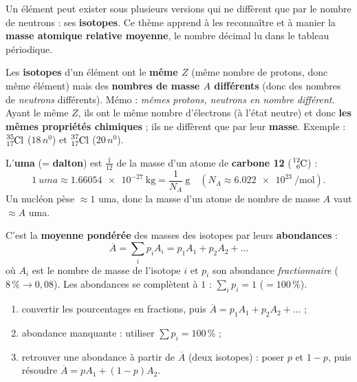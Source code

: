 \documentclass[11pt,a4paper]{article}
\begin{document}

Un élément peut exister sous plusieurs versions qui ne diffèrent que par le nombre de neutrons : ses
\textbf{isotopes}. Ce thème apprend à les reconnaître et à manier la \textbf{masse atomique relative
moyenne}, le nombre décimal lu dans le tableau périodique.

\begin{cle}[isotopes]
Les \textbf{isotopes} d'un élément ont le \textbf{même $Z$} (même nombre de protons, donc même élément)
mais des \textbf{nombres de masse $A$ différents} (donc des nombres de \emph{neutrons} différents).
Mémo : \emph{mêmes protons, neutrons en nombre différent}. Ayant le même $Z$, ils ont le même nombre
d'électrons (à l'état neutre) et donc \textbf{les mêmes propriétés chimiques} ; ils ne diffèrent que par
leur \textbf{masse}. Exemple : $\ce{^{35}_{17}Cl}$ ($18\,n^0$) et $\ce{^{37}_{17}Cl}$ ($20\,n^0$).
\end{cle}

\begin{cle}
L'\textbf{uma} (= \textbf{dalton}) est $\tfrac{1}{12}$ de la masse d'un atome de \textbf{carbone 12}
($\ce{^{12}_{6}C}$) :
\[ \SI{1}{uma} \approx \SI{1,66054e-27}{\kilo\gram} = \frac{1}{N_{\!A}}\ \si{\gram}
   \quad(N_{\!A}\approx\SI{6,022e23}{\per\mole}). \]
Un nucléon pèse $\approx 1$ uma, donc la masse d'un atome de nombre de masse $A$ vaut $\approx A$ uma.
\end{cle}

\begin{cle}
C'est la \textbf{moyenne pondérée} des masses des isotopes par leurs \textbf{abondances} :
\[ \boxed{\ \overline{A} = \sum_i p_i A_i = p_1 A_1 + p_2 A_2 + \dots\ } \]
où $A_i$ est le nombre de masse de l'isotope $i$ et $p_i$ son abondance \emph{fractionnaire}
($8\,\% \to 0{,}08$). Les abondances se complètent à $1$ : $\sum_i p_i = 1$ ($=100\,\%$).
\end{cle}

\begin{methode}
\begin{enumerate}[leftmargin=1.7em,topsep=2pt,itemsep=1pt]
  \item convertir les pourcentages en fractions, puis $\overline{A} = p_1 A_1 + p_2 A_2 + \dots$ ;
  \item abondance manquante : utiliser $\sum p_i = 100\,\%$ ;
  \item retrouver une abondance à partir de $\overline{A}$ (deux isotopes) : poser $p$ et $1-p$, puis
        résoudre $\overline{A} = pA_1 + (1-p)A_2$.
\end{enumerate}
\end{methode}
\end{document}
